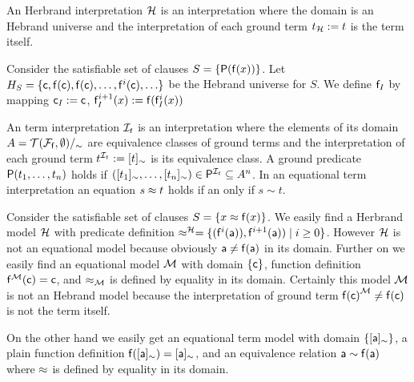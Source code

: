 \begin{definition}
	An {\myem Herbrand interpretation} ${\mathcal H}$ is an interpretation where the domain 
	is an Hebrand universe
	and the interpretation of each ground term $t_{\mathcal H} := t$ is the term itself.
\end{definition}

\begin{example}
	Consider the satisfiable set of clauses 
	$S = \{  
		{\mathsf P}({\mathsf f}(x)) 
	\}$. 
	Let $H_S = \{ 
		{\mathsf c}, {\mathsf f}({\mathsf c}), {\mathsf f}({\mathsf c}), \ldots, {\mathsf f}^i({\mathsf c}), \ldots
	\}$ be the Hebrand universe for $S$.
	We define ${\mathsf f}_I$ by mapping ${\mathsf c}_I := {\mathsf c}$,
	${\mathsf f}_I^{i+1}(x) := {\mathsf f} ({\mathsf f}_I^i(x))$
\end{example}

\begin{definition}
	An {\myem term interpretation} 
	${\mathcal I}_t$ 
	is an interpretation 
	where the elements of its domain $A = {{\mathcal T}({\mathcal F}_{\mathsf f},\emptyset)}/_\sim$ 
		are equivalence classes of ground terms
		and the interpretation of each ground term $t^{{\mathcal I}_t} := [t]_\sim$ is its equivalence class.
	 A ground predicate ${\mathsf P}(t_1,\ldots,t_n)$ holds if 
	 $([t_1]_\sim,\ldots,[t_n]_\sim) \in {\mathsf P}^{{\mathcal I}_t} \subseteq A^n$.
	In an {\myem equational} term interpretation an equation $s\approx t$ holds if an only if $s\sim t$.
	
\end{definition}

\begin{example}
	Consider the satisfiable set of clauses $S = \{ x \approx {\mathsf f}(x) \}$. 
%	
	We easily find a Herbrand model ${\mathcal H}$ with
	predicate definition $\approx^{\mathcal H} = \{ ({\mathsf f}^{i}({\mathsf a})), {\mathsf f}^{i+1}({\mathsf a})) \mid i\geq 0  \} $. 
	However ${\mathcal H}$ is not an equational model because obviously ${\mathsf a}\neq{\mathsf f}({\mathsf a})$ in its domain.
%	
	Further on we easily find an equational model ${\mathcal M}$ 
	with domain $\{ {\mathsf c} \}$, function definition ${\mathsf f}^{\mathcal M}({\mathsf c}) = {\mathsf c}$, 
	and $\approx_{\mathcal M}$ is defined by equality in its domain.
	Certainly this model ${\mathcal M}$ is not an Hebrand model 
	because the interpretation of ground term ${{\mathsf f}({\mathsf c})}^{\mathcal M} \neq {\mathsf f}({\mathsf c})$ is not the term itself.
	
	On the other hand we easily get an equational term model with domain $\{ [{\mathsf a}]_\sim\}$, 
	a plain function definition
	${\mathsf f}([{\mathsf a}]_\sim) = [{\mathsf a}]_\sim$, 
	and an equivalence relation
	${\mathsf a} \sim {\mathsf f}({\mathsf a})$
	where $\approx$ is defined by equality in its domain.	
\end{example}



